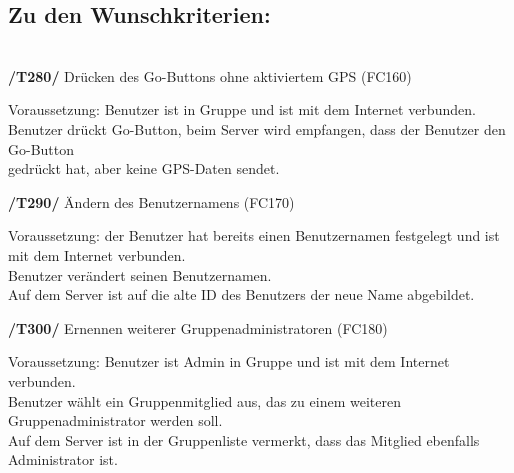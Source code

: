 \subsection{Zu den Wunschkriterien:}\\

\textbf{/T280/} Drücken des Go-Buttons ohne aktiviertem GPS (FC160)\\
\begin{center}
\vspace{-\parskip}
\begin{minipage}[t]{0.9\textwidth}
Voraussetzung: Benutzer ist in Gruppe und ist mit dem Internet verbunden.           \\
Benutzer drückt Go-Button, beim Server wird empfangen, dass der Benutzer den Go-Button\\
gedrückt hat, aber keine GPS-Daten sendet.                                             \\
\end{minipage}
\end{center}

\textbf{/T290/} Ändern des Benutzernamens (FC170)\\
\begin{center}
\vspace{-\parskip}
\begin{minipage}[t]{0.9\textwidth}
Voraussetzung: der Benutzer hat bereits einen Benutzernamen festgelegt und ist mit dem Internet verbunden.\\
Benutzer verändert seinen Benutzernamen.                                                                   \\
Auf dem Server ist auf die alte ID des Benutzers der neue Name abgebildet.                                  \\
\end{minipage}
\end{center}

\textbf{/T300/} Ernennen weiterer Gruppenadministratoren (FC180)\\
\begin{center}
\vspace{-\parskip}
\begin{minipage}[t]{0.9\textwidth}
Voraussetzung: Benutzer ist Admin in Gruppe und ist mit dem Internet verbunden.\\
Benutzer wählt ein Gruppenmitglied aus, das zu einem weiteren Gruppenadministrator werden soll.\\
Auf dem Server ist in der Gruppenliste vermerkt, dass das Mitglied ebenfalls Administrator ist.\\
\end{minipage}
\end{center}

